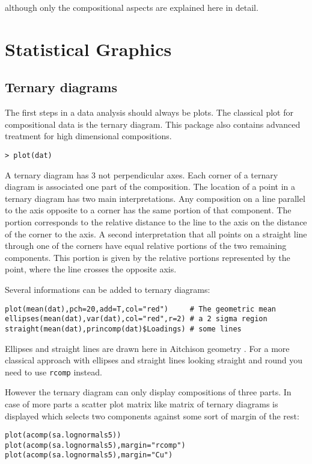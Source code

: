 \documentclass{article}
\newcommand{\code}[1]{{\tt #1}}
\begin{document}
although only the compositional aspects are explained here in detail.

\section{Statistical Graphics}
\subsection{Ternary diagrams}
The first steps in a data analysis should always be plots. The classical plot
for compositional data is the ternary diagram. This package also contains 
advanced treatment for high dimensional compositions.
\begin{verbatim}
> plot(dat)
\end{verbatim}
A ternary diagram has 3 not perpendicular axes.  Each corner of a ternary
diagram is associated one part of the composition.  The location of a point in
a ternary diagram has two main interpretations. Any composition on a line
parallel to the axis opposite to a corner has the same portion of that
component. The portion corresponds to the relative distance to the line to the
axis on the distance of the corner to the axis. A second interpretation that
all points on a straight line through one of the corners have equal relative
portions of the two remaining components. This portion is given by the
relative portions represented by the point, where the line crosses the
opposite axis.\par
Several informations can be added to ternary diagrams:
\begin{verbatim}
plot(mean(dat),pch=20,add=T,col="red")     # The geometric mean
ellipses(mean(dat),var(dat),col="red",r=2) # a 2 sigma region
straight(mean(dat),princomp(dat)$Loadings) # some lines
\end{verbatim}
Ellipses and straight lines are drawn here in Aitchison geometry
\cite{PE01}. For a more classical approach with ellipses and straight lines
looking straight and round you need to use \code{rcomp} instead. 
\par
However the ternary diagram can only display compositions of three parts. In
case of more parts a scatter plot matrix like matrix of ternary diagrams is
displayed which selects two components against some sort of margin of the
rest:
\begin{verbatim}
plot(acomp(sa.lognormals5))
plot(acomp(sa.lognormals5),margin="rcomp")
plot(acomp(sa.lognormals5),margin="Cu")
\end{verbatim}
\end{document}
